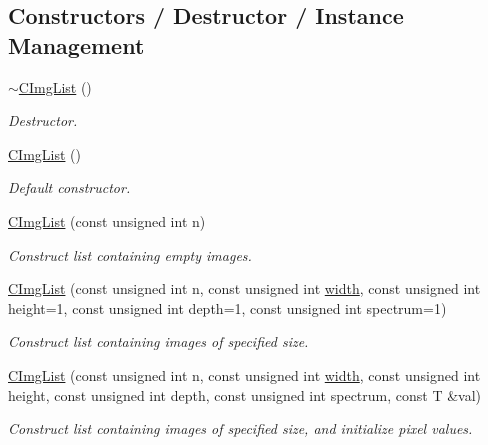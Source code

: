 \subsection*{Constructors / Destructor / Instance Management}
\begin{DoxyCompactItemize}
\item 
\hyperlink{structcimg__library__suffixed_1_1CImgList_a8f847fd81ab71a71dadf11db36f49dd3}{$\sim$\+C\+Img\+List} ()
\begin{DoxyCompactList}\small\item\em Destructor. \end{DoxyCompactList}\item 
\hyperlink{structcimg__library__suffixed_1_1CImgList_a12d442d390d1544946e1d63149ebb821}{C\+Img\+List} ()
\begin{DoxyCompactList}\small\item\em Default constructor. \end{DoxyCompactList}\item 
\hyperlink{structcimg__library__suffixed_1_1CImgList_abf01d78f440ac4203e4d4055ac7b810b}{C\+Img\+List} (const unsigned int n)
\begin{DoxyCompactList}\small\item\em Construct list containing empty images. \end{DoxyCompactList}\item 
\hyperlink{structcimg__library__suffixed_1_1CImgList_a0b0ca855289f84488b25862ebc283e56}{C\+Img\+List} (const unsigned int n, const unsigned int \hyperlink{structcimg__library__suffixed_1_1CImgList_a60d81967a11f946a46ab28f2f14109f7}{width}, const unsigned int height=1, const unsigned int depth=1, const unsigned int spectrum=1)
\begin{DoxyCompactList}\small\item\em Construct list containing images of specified size. \end{DoxyCompactList}\item 
\hyperlink{structcimg__library__suffixed_1_1CImgList_ad0ee21e33eabe87015391615c7994195}{C\+Img\+List} (const unsigned int n, const unsigned int \hyperlink{structcimg__library__suffixed_1_1CImgList_a60d81967a11f946a46ab28f2f14109f7}{width}, const unsigned int height, const unsigned int depth, const unsigned int spectrum, const T \&val)
\begin{DoxyCompactList}\small\item\em Construct list containing images of specified size, and initialize pixel values. \end{DoxyCompactList}\item 

\end{DoxyCompactItemize}
